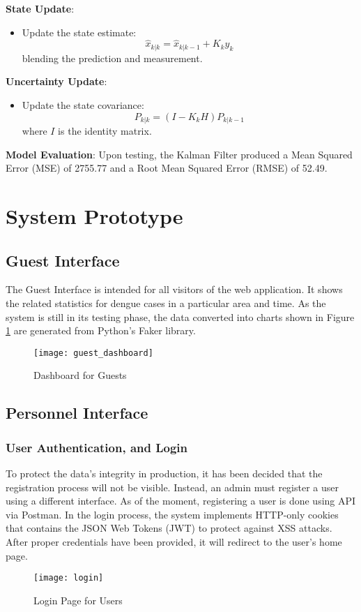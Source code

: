 \textbf{State Update}:
\begin{itemize}
	\item Update the state estimate:
	\[
	\hat{x}_{k|k} = \hat{x}_{k|k-1} + K_k y_k
	\]
	blending the prediction and measurement.
\end{itemize}

\textbf{Uncertainty Update}:
\begin{itemize}
	\item Update the state covariance:
	\[
	P_{k|k} = (I - K_k H) P_{k|k-1}
	\]
	where \( I \) is the identity matrix.
\end{itemize}

\textbf{Model Evaluation}:
Upon testing, the Kalman Filter produced a Mean Squared Error (MSE) of 2755.77 and a Root Mean Squared Error (RMSE) of 52.49.

\clearpage
\section{System Prototype}
\subsection{Guest Interface}
The Guest Interface is intended for all visitors of the web application. It shows the related statistics for dengue cases in a particular area and time. As the system is still in its testing phase, the data converted into charts shown in Figure \ref{fig:guest_dashboard} are generated from Python's Faker library. 
\begin{figure}[H]
	\centering
	\texttt{[image: guest\_dashboard]}
	\caption{Dashboard for Guests}
	\label{fig:guest_dashboard}
\end{figure}
\subsection{Personnel Interface}
\subsubsection{User Authentication, and Login}
To protect the data's integrity in production, it has been decided that the registration process will not be visible. Instead, an admin must register a user using a different interface. As of the moment, registering a user is done using API via Postman. In the login process, the system implements HTTP-only cookies that contains the JSON Web Tokens (JWT) to protect against XSS attacks. After proper credentials have been provided, it will redirect to the user's home page.
\begin{figure}[H]
	\centering
	\texttt{[image: login]}
	\caption{Login Page for Users}
	\label{fig:login_page}
\end{figure}
